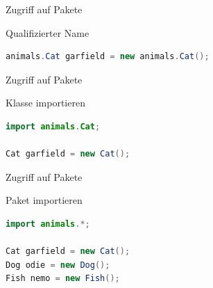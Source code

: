 \documentclass[18pt]{beamer}
\begin{document}
\begin{frame}[fragile]{Zugriff auf Pakete}
    \begin{exampleblock}{Qualifizierter Name}
        \begin{lstlisting}[language=Java]
animals.Cat garfield = new animals.Cat();
        \end{lstlisting}

    \end{exampleblock}

\end{frame}

\begin{frame}[fragile]{Zugriff auf Pakete}
    \begin{exampleblock}{Klasse importieren}
        \begin{lstlisting}[language=Java]
import animals.Cat;

Cat garfield = new Cat();
        \end{lstlisting}

    \end{exampleblock}

\end{frame}

\begin{frame}[fragile]{Zugriff auf Pakete}
    \begin{exampleblock}{Paket importieren}
        \begin{lstlisting}[language=Java]
import animals.*;

Cat garfield = new Cat();
Dog odie = new Dog();
Fish nemo = new Fish();
        \end{lstlisting}

    \end{exampleblock}

\end{frame}
\end{document}
